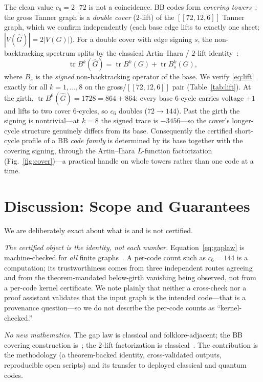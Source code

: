 \documentclass[journal]{IEEEtran}
\DeclareMathOperator{\tr}{tr}
\begin{document}
The clean value $c_6=2\cdot72$ is not a coincidence. BB codes form \emph{covering
towers}~\cite{Symons}: the gross Tanner graph is a \emph{double cover} ($2$-lift) of the
$[[72,12,6]]$ Tanner graph, which we confirm independently (each base edge lifts to exactly one
sheet; $|V(\widehat G)|=2|V(G)|$). For a double cover with edge signing $s$, the
non-backtracking spectrum splits by the classical Artin--Ihara / $2$-lift
identity~\cite{StarkTerras,MSS}:
\begin{equation}
\tr B^k(\widehat G) = \tr B^k(G) + \tr B_s^k(G),
\label{eq:lift}
\end{equation}
where $B_s$ is the \emph{signed} non-backtracking operator of the base. We verify
\eqref{eq:lift} exactly for all $k=1,\dots,8$ on the gross/$[[72,12,6]]$ pair
(Table~\ref{tab:lift}). At the girth, $\tr B^6(\widehat G)=1728=864+864$: every base $6$-cycle
carries voltage $+1$ and lifts to two cover $6$-cycles, so $c_6$ doubles ($72\to144$). Past the
girth the signing is nontrivial---at $k=8$ the signed trace is $-3456$---so the cover's
longer-cycle structure genuinely differs from its base. Consequently the certified short-cycle
profile of a BB \emph{code family} is determined by its base together with the covering
signing, through the Artin--Ihara $L$-function factorization (Fig.~\ref{fig:cover})---a
practical handle on whole towers rather than one code at a time.

\section{Discussion: Scope and Guarantees}
\label{sec:honest}
We are deliberately exact about what is and is not certified.

\emph{The certified object is the identity, not each number.} Equation~\eqref{eq:gaplaw} is
machine-checked for \emph{all} finite graphs~\cite{PartVI}. A per-code count such as $c_6=144$
is a computation; its trustworthiness comes from three independent routes agreeing and from the
theorem-mandated below-girth vanishing being observed, not from a per-code kernel certificate.
We note plainly that neither a cross-check nor a proof assistant validates that the input graph
is the intended code---that is a provenance question---so we do not describe the per-code counts
as ``kernel-checked.''

\emph{No new mathematics.} The gap law is classical and folklore-adjacent; the BB covering
construction is~\cite{Symons}; the $2$-lift factorization is classical~\cite{StarkTerras,MSS}.
The contribution is the methodology (a theorem-backed identity, cross-validated outputs,
reproducible open scripts) and its transfer to deployed classical and quantum codes.
\end{document}
